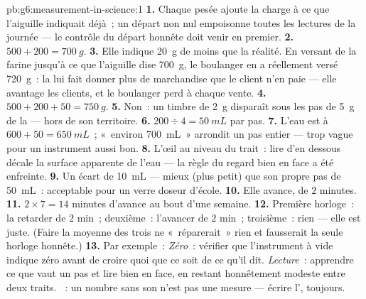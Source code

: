 \begin{solution}{pb:g6:measurement-in-science:1}
\textbf{1.} Chaque pesée ajoute la charge à ce que l'aiguille
indiquait déjà~; un départ non nul empoisonne toutes les lectures de
la journée --- le contrôle du départ honnête doit venir en premier.
\textbf{2.} $500 + 200 = \qty{700}{g}$.
\textbf{3.} Elle indique \qty{20}{g} de moins que la réalité. En
versant de la farine jusqu'à ce que l'aiguille dise \qty{700}{g}, le
boulanger en a réellement versé \qty{720}{g}~: la  lui fait
donner plus de marchandise que le client n'en paie --- elle avantage
les clients, et le boulanger perd à chaque vente.
\textbf{4.} $500 + 200 + 50 = \qty{750}{g}$.
\textbf{5.} Non~: un timbre de \qty{2}{g} disparaît sous les pas de
\qty{5}{g} de la  --- hors de son territoire.
\textbf{6.} $200 \div 4 = \qty{50}{mL}$ par pas.
\textbf{7.} L'eau est à $600 + 50 = \qty{650}{mL}$~; «~environ
\qty{700}{mL}~» arrondit un pas entier --- trop vague pour un
instrument aussi bon.
\textbf{8.} L'œil au niveau du trait~: lire d'en dessous décale la
surface apparente de l'eau --- la règle du regard bien en face a été
enfreinte.
\textbf{9.} Un écart de \qty{10}{mL} --- mieux (plus petit) que son
propre pas de \qty{50}{mL}~: acceptable pour un verre doseur
d'école.
\textbf{10.} Elle avance, de $2$ minutes.
\textbf{11.} $2 \times 7 = 14$ minutes d'avance au bout d'une
semaine.
\textbf{12.} Première horloge~: la retarder de $2$ min~; deuxième~:
l'avancer de $2$ min~; troisième~: rien --- elle est juste. (Faire la
moyenne des trois ne «~réparerait~» rien et fausserait la seule
horloge honnête.)
\textbf{13.} Par exemple~: \emph{Zéro}~: vérifier que l'instrument à
vide indique zéro avant de croire quoi que ce soit de ce qu'il dit.
\emph{Lecture}~: apprendre ce que vaut un pas et lire bien en face,
en restant honnêtement modeste entre deux traits. \emph{}~: un
nombre sans son  n'est pas une mesure --- écrire l',
toujours.
\end{solution}
